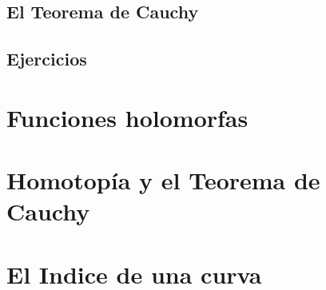 \documentclass[]{book}
\theoremstyle{definition}
\theoremstyle{definition}
\theoremstyle{definition}
\theoremstyle{remark}
\begin{document}
\hypertarget{el-teorema-de-cauchy}{%
\section{El Teorema de Cauchy}\label{el-teorema-de-cauchy}}

\hypertarget{ejercicios-3}{%
\section{Ejercicios}\label{ejercicios-3}}

\hypertarget{funciones-holomorfas}{%
\chapter{Funciones holomorfas}\label{funciones-holomorfas}}

\hypertarget{homotopuxeda-y-el-teorema-de-cauchy}{%
\chapter{Homotopía y el Teorema de Cauchy}\label{homotopuxeda-y-el-teorema-de-cauchy}}

\hypertarget{el-indice-de-una-curva}{%
\chapter{El Indice de una curva}\label{el-indice-de-una-curva}}


\end{document}
